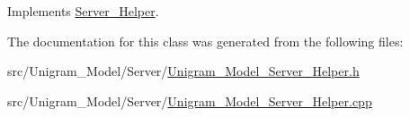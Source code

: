 Implements \hyperlink{class_server___helper_a8dbb2fd15cdfcb6464a965893482b775}{Server\_\-Helper}.



The documentation for this class was generated from the following files:\begin{DoxyCompactItemize}
\item 
src/Unigram\_\-Model/Server/\hyperlink{_unigram___model___server___helper_8h}{Unigram\_\-Model\_\-Server\_\-Helper.h}\item 
src/Unigram\_\-Model/Server/\hyperlink{_unigram___model___server___helper_8cpp}{Unigram\_\-Model\_\-Server\_\-Helper.cpp}\end{DoxyCompactItemize}
